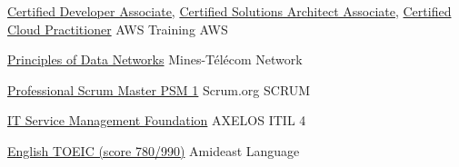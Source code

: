 \newcommand{\urlNewWindow}[1]{\href[pdfnewwindow=true]{#1}{\nolinkurl{#1}}}




\begin{cvhonors}

  \cvhonor
    {} %
    {\href{https://www.certmetrics.com/amazon/public/badge.aspx?i=2&t=c&d=2019-08-20&ci=AWS00767474}{{\hspace{0.5mm} Certified Developer Associate,}} 
    \href{https://www.certmetrics.com/amazon/public/badge.aspx?i=1&t=c&d=2019-11-27&ci=AWS00767474}{{\hspace{0.5mm} Certified Solutions Architect Associate,}}
    \href{https://www.certmetrics.com/amazon/public/badge.aspx?i=9&t=c&d=2019-12-07&ci=AWS00767474}{{\hspace{0.2mm} Certified Cloud Practitioner}}}%
    {AWS Training} %
    {AWS} %

  \cvhonor
    {} %
    {\href{https://www.cvtrust.com/SmartDiploma/Default.aspx?xVyP15sFUKhhZYYSkTh/gZ+USyBrUQL+51c7cp1nHf9Qlno7xHUeqmlWDHvVj5gO}{{\hspace{1mm} Principles of Data Networks}}}%
    { Mines-Télécom } %
    {Network} %

  \cvhonor
    {} %
    {\href{https://drive.google.com/file/d/1Np0XF8Lp99kaLGcngStGzi-czhxU19N0/view}{{\hspace{1mm}Professional Scrum Master PSM 1}}} %
    {Scrum.org} %
    {SCRUM} %

  \cvhonor
    {} %
    {\href{}{{\hspace{1mm}IT Service Management Foundation}}} %
    {AXELOS} %
    {ITIL 4} %

  \cvhonor
    {} %
    {\href{https://drive.google.com/file/d/0B-JcY6JJq2o8cmtWSm1ydnk1anc/view}{{\hspace{1mm} English TOEIC (score 780/990)}}}%
    {Amideast} %
    {Language} %

\end{cvhonors}


